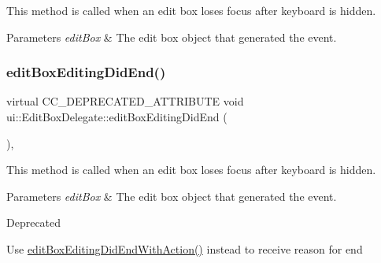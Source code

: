 This method is called when an edit box loses focus after keyboard is hidden. 
\begin{DoxyParams}{Parameters}
{\em edit\+Box} & The edit box object that generated the event. \\
\hline
\end{DoxyParams}
\mbox{\label{classui_1_1EditBoxDelegate_a0703fe7737a945f4791c53be7dcffa1e}} 
\subsubsection{\texorpdfstring{edit\+Box\+Editing\+Did\+End()}{editBoxEditingDidEnd()}\hspace{0.1cm}{\footnotesize\ttfamily [2/2]}}
{\footnotesize\ttfamily virtual C\+C\+\_\+\+D\+E\+P\+R\+E\+C\+A\+T\+E\+D\+\_\+\+A\+T\+T\+R\+I\+B\+U\+TE void ui\+::\+Edit\+Box\+Delegate\+::edit\+Box\+Editing\+Did\+End (\begin{DoxyParamCaption}\item[{\hyperlink{classui_1_1EditBox}{Edit\+Box} $\ast$}]{ }\end{DoxyParamCaption})\hspace{0.3cm}{\ttfamily [inline]}, {\ttfamily [virtual]}}

This method is called when an edit box loses focus after keyboard is hidden. 
\begin{DoxyParams}{Parameters}
{\em edit\+Box} & The edit box object that generated the event. \\
\hline
\end{DoxyParams}
\begin{DoxyRefDesc}{Deprecated}
\item[\hyperlink{deprecated__deprecated000375}{Deprecated}]Use \hyperlink{classui_1_1EditBoxDelegate_a61ed8e1dccf66b4734f36e18e3bb14be}{edit\+Box\+Editing\+Did\+End\+With\+Action()} instead to receive reason for end \end{DoxyRefDesc}
\mbox{\label{classui_1_1EditBoxDelegate_a61ed8e1dccf66b4734f36e18e3bb14be}} 
